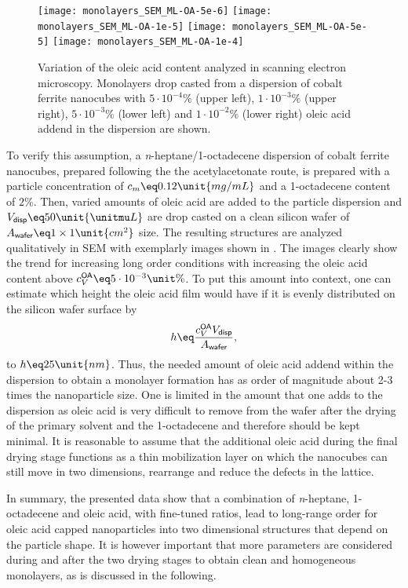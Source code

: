 \documentclass[\main/dresen_thesis.tex]{subfiles}
\begin{document}
    \begin{figure}[tb]
      \centering
      \texttt{[image: monolayers\_SEM\_ML-OA-5e-6]}
      \texttt{[image: monolayers\_SEM\_ML-OA-1e-5]}
      \texttt{[image: monolayers\_SEM\_ML-OA-5e-5]}
      \texttt{[image: monolayers\_SEM\_ML-OA-1e-4]}
      \caption{\label{fig:monolayers:preparation:solventVariation:OAAddend}Variation of the oleic acid content analyzed in scanning electron microscopy. Monolayers drop casted from a dispersion of cobalt ferrite nanocubes with $5\cdot10^{-4} \unit{\%}$ (upper left), $1\cdot10^{-3} \unit{\%}$ (upper right), $5\cdot10^{-3} \unit{\%}$ (lower left) and $1\cdot10^{-2} \unit{\%}$ (lower right) oleic acid addend in the dispersion are shown.}
    \end{figure}

    To verify this assumption, a \textit{n}-heptane/1-octadecene dispersion of cobalt ferrite nanocubes, prepared following the the acetylacetonate route, is prepared with a particle concentration of $c_m \eq 0.12 \unit{mg/mL}$ and a 1-octadecene content of $2\unit{\%}$.
    Then, varied amounts of oleic acid are added to the particle dispersion and $V_\textsf{disp} \eq 50 \unit{\unitmu L}$ are drop casted on a clean silicon wafer of $ A_\textsf{wafer} \eq 1 \times 1 \unit{cm^2}$ size.
    The resulting structures are analyzed qualitatively in SEM with exemplarly images shown in .
    The images clearly show the trend for increasing long order conditions with increasing the oleic acid content above $c_V^\textsf{OA} \eq 5\cdot10^{-3} \unit{\%}$.
    To put this amount into context, one can estimate which height the oleic acid film would have if it is evenly distributed on the silicon wafer surface by
    \begin{align}
      h \eq \frac{c_V^\textsf{OA} V_\textsf{disp}}{A_\textsf{wafer}}, \label{eq:monolayers:preparation:solventVariation:OAAddend}
    \end{align}
    to $h \eq 25 \unit{nm}$.
    Thus, the needed amount of oleic acid addend within the dispersion to obtain a monolayer formation has as order of magnitude about 2-3 times the nanoparticle size.
    One is limited in the amount that one adds to the dispersion as oleic acid is very difficult to remove from the wafer after the drying of the primary solvent and the 1-octadecene and therefore should be kept minimal.
    It is reasonable to assume that the additional oleic acid during the final drying stage functions as a thin mobilization layer on which the nanocubes can still move in two dimensions, rearrange and reduce the defects in the lattice.

    In summary, the presented data show that a combination of \textit{n}-heptane, 1-octadecene and oleic acid, with fine-tuned ratios, lead to long-range order for oleic acid capped nanoparticles into two dimensional structures that depend on the particle shape.
    It is however important that more parameters are considered during and after the two drying stages to obtain clean and homogeneous monolayers, as is discussed in the following.
\end{document}
